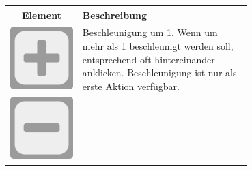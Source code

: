 \documentclass[12pt,a4paper, ngerman, oneside]{scrartcl}
\begin{document}
\begin{table}[h!]
  \centering
  \begin{tabular}{ c m{0.7\linewidth} }
    Element & Beschreibung \\
    \hline
    \begin{minipage}{1cm}
      \includegraphics[width=\linewidth]{bilder/plus-square}
    \end{minipage}
    &
    Beschleunigung um 1. Wenn um mehr als 1 beschleunigt werden soll, entsprechend oft hintereinander anklicken. Beschleunigung ist nur als erste Aktion verfügbar.
    \\
    \begin{minipage}{1cm}
      \includegraphics[width=\linewidth]{bilder/minus-square}

\end{minipage}
\end{tabular}
\end{table}
\end{document}
